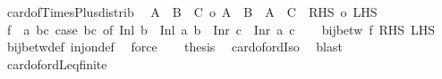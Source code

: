 \begin{isabellebody}
%
\endisadelimproof
\isanewline
{}\isamarkupfalse%
\ card{\isacharunderscore}{\kern0pt}of{\isacharunderscore}{\kern0pt}Times{\isacharunderscore}{\kern0pt}Plus{\isacharunderscore}{\kern0pt}distrib{\isacharcolon}{\kern0pt}\isanewline
\ \ {\isachardoublequoteopen}{\isacharbar}{\kern0pt}A\ {\isasymtimes}\ {\isacharparenleft}{\kern0pt}B\ {\isacharless}{\kern0pt}{\isacharplus}{\kern0pt}{\isachargreater}{\kern0pt}\ C{\isacharparenright}{\kern0pt}{\isacharbar}{\kern0pt}\ {\isacharequal}{\kern0pt}o\ {\isacharbar}{\kern0pt}A\ {\isasymtimes}\ B\ {\isacharless}{\kern0pt}{\isacharplus}{\kern0pt}{\isachargreater}{\kern0pt}\ A\ {\isasymtimes}\ C{\isacharbar}{\kern0pt}{\isachardoublequoteclose}\ {\isacharparenleft}{\kern0pt}\ {\isachardoublequoteopen}{\isacharbar}{\kern0pt}{\isacharquery}{\kern0pt}RHS{\isacharbar}{\kern0pt}\ {\isacharequal}{\kern0pt}o\ {\isacharbar}{\kern0pt}{\isacharquery}{\kern0pt}LHS{\isacharbar}{\kern0pt}{\isachardoublequoteclose}{\isacharparenright}{\kern0pt}\isanewline
%
\isadelimproof
%
\endisadelimproof
%
\isatagproof
{}\isamarkupfalse%
\ {\isacharminus}{\kern0pt}\isanewline
\ \ \isamarkupfalse%
\ {\isacharquery}{\kern0pt}f\ {\isacharequal}{\kern0pt}\ {\isachardoublequoteopen}{\isasymlambda}{\isacharparenleft}{\kern0pt}a{\isacharcomma}{\kern0pt}\ bc{\isacharparenright}{\kern0pt}{\isachardot}{\kern0pt}\ case\ bc\ of\ Inl\ b\ {\isasymRightarrow}\ Inl\ {\isacharparenleft}{\kern0pt}a{\isacharcomma}{\kern0pt}\ b{\isacharparenright}{\kern0pt}\ {\isacharbar}{\kern0pt}\ Inr\ c\ {\isasymRightarrow}\ Inr\ {\isacharparenleft}{\kern0pt}a{\isacharcomma}{\kern0pt}\ c{\isacharparenright}{\kern0pt}{\isachardoublequoteclose}\isanewline
\ \ \isamarkupfalse%
\ {\isachardoublequoteopen}bij{\isacharunderscore}{\kern0pt}betw\ {\isacharquery}{\kern0pt}f\ {\isacharquery}{\kern0pt}RHS\ {\isacharquery}{\kern0pt}LHS{\isachardoublequoteclose}\ \isamarkupfalse%
\ bij{\isacharunderscore}{\kern0pt}betw{\isacharunderscore}{\kern0pt}def\ inj{\isacharunderscore}{\kern0pt}on{\isacharunderscore}{\kern0pt}def\ \isamarkupfalse%
\ force\isanewline
\ \ \isamarkupfalse%
\ {\isacharquery}{\kern0pt}thesis\ \isamarkupfalse%
\ card{\isacharunderscore}{\kern0pt}of{\isacharunderscore}{\kern0pt}ordIso\ \isamarkupfalse%
\ blast\isanewline
{}\isamarkupfalse%
%
\endisatagproof
{\isafoldproof}%
%
\isadelimproof
\isanewline
%
\endisadelimproof
\isanewline
{}\isamarkupfalse%
\ card{\isacharunderscore}{\kern0pt}of{\isacharunderscore}{\kern0pt}ordLeq{\isacharunderscore}{\kern0pt}finite{\isacharcolon}{\kern0pt}\isanewline

\end{isabellebody}
